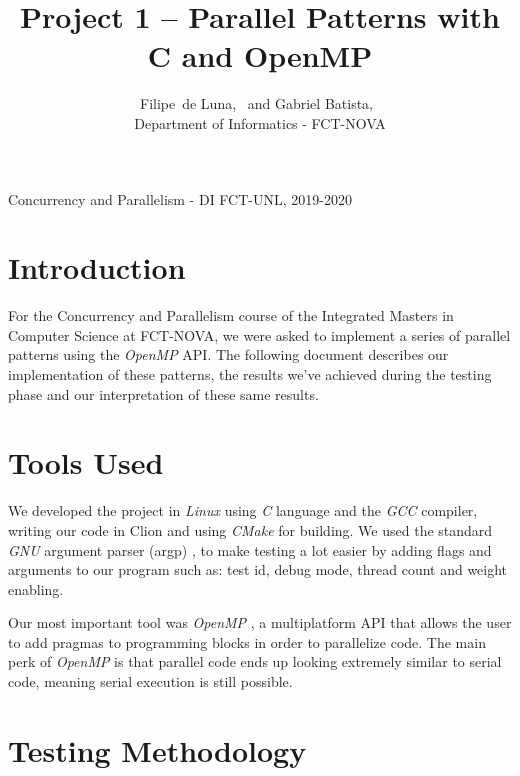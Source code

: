 \documentclass[9pt,journal]{IEEEtran}
\begin{document}

\title{Project 1 -- Parallel Patterns with C and OpenMP}


\author{
	{
		Filipe~de Luna,~ and
        Gabriel Batista,~
    } \\ Department of Informatics - FCT-NOVA
        
}

%
{Concurrency and Parallelism - DI FCT-UNL, 2019-2020}

\maketitle

\section{Introduction}
For the Concurrency and Parallelism course of the Integrated Masters in Computer Science at FCT-NOVA, we were asked to implement a series of parallel patterns using the \textit{OpenMP} API. The following document describes our implementation of these patterns, the results we’ve achieved during the testing phase and our interpretation of these same results.

\section{Tools Used}

We developed the project in \textit{Linux} using \textit{C} language and the \textit{GCC} compiler, writing our code in Clion and using \textit{CMake} for building. We used the standard \textit{GNU} argument parser (argp) \cite{argp}, to make testing a lot easier by adding flags and arguments to our program such as: test id, debug mode, thread count and weight enabling.

Our most important tool was \textit{OpenMP} \cite{omp}, a multiplatform API that allows the user to add pragmas to programming blocks in order to parallelize code. The main perk of \textit{OpenMP} is that parallel code ends up looking extremely similar to serial code, meaning serial execution is still possible.

\section{Testing Methodology}
\end{document}
